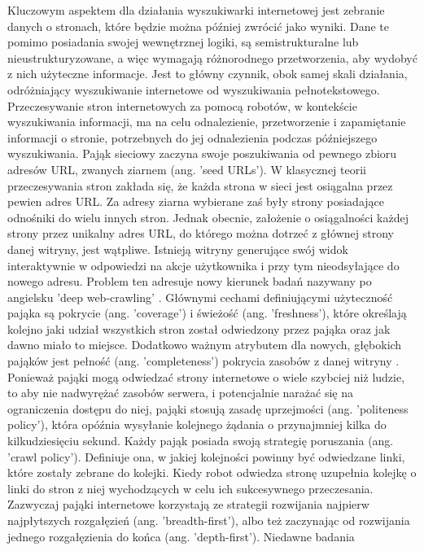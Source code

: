 Kluczowym aspektem dla działania
wyszukiwarki internetowej jest zebranie danych o stronach, które będzie można później zwrócić jako
wyniki. Dane te pomimo posiadania swojej wewnętrznej logiki, są semistrukturalne lub
nieustrukturyzowane, a więc wymagają różnorodnego przetworzenia, aby wydobyć z nich użyteczne
informacje. Jest to główny czynnik, obok samej skali działania, odróżniający wyszukiwanie internetowe od wyszukiwania
pełnotekstowego.
Przeczesywanie stron internetowych za pomocą robotów, w kontekście wyszukiwania
informacji, ma na celu odnalezienie, przetworzenie i zapamiętanie informacji o stronie, potrzebnych do jej
odnalezienia podczas późniejszego wyszukiwania. Pająk sieciowy zaczyna swoje poszukiwania od pewnego zbioru
adresów URL, zwanych ziarnem (ang. 'seed URLs'). W klasycznej teorii przeczesywania stron
zakłada się, że każda strona w sieci jest osiągalna przez pewien adres URL. Za adresy ziarna wybierane
zaś były strony posiadające odnośniki do wielu innych stron. Jednak obecnie, założenie o osiągalności
każdej strony przez unikalny adres URL, do którego można dotrzeć z głównej strony danej witryny, jest wątpliwe.
Istnieją witryny generujące swój widok interaktywnie w odpowiedzi na akcje użytkownika i przy tym
nieodsyłające do nowego adresu. Problem ten adresuje nowy kierunek badań nazywany po angielsku
'deep web-crawling' \autocite{mirtaheri2014brief}. Głównymi cechami definiującymi użyteczność pająka są pokrycie (ang.
'coverage') i świeżość (ang. 'freshness'), które określają kolejno jaki udział wszystkich stron został odwiedzony przez pająka oraz jak dawno miało to miejsce. Dodatkowo ważnym atrybutem dla nowych, głębokich
pająków jest pełność (ang. 'completeness') pokrycia zasobów z danej witryny \autocite{mirtaheri2014brief}. Ponieważ pająki
mogą odwiedzać strony internetowe o wiele szybciej niż ludzie, to aby nie nadwyrężać zasobów serwera, i
potencjalnie narażać się na ograniczenia dostępu do niej, pająki stosują zasadę uprzejmości (ang.
'politeness policy'), która opóźnia wysyłanie kolejnego żądania o przynajmniej kilka do kilkudziesięciu
sekund.
Każdy pająk posiada swoją strategię poruszania (ang. 'crawl policy'). Definiuje ona, w jakiej
kolejności powinny być odwiedzane linki, które zostały zebrane do kolejki. Kiedy robot odwiedza
stronę uzupełnia kolejkę o linki do stron z niej wychodzących w celu ich sukcesywnego przeczesania. Zazwyczaj pająki
internetowe korzystają ze strategii rozwijania najpierw najpłytszych rozgałęzień (ang. 'breadth-first'), albo też zaczynając od rozwijania jednego rozgałęzienia do końca (ang. 'depth-first'). Niedawne badania
